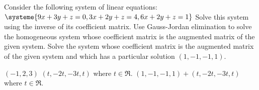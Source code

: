 

\begin{Exercise}[
name={},
title={}, 
difficulty=0,
origin={\cite{BS}}]
Consider the following system of linear equations:
$\systeme{9x+3y+z=0,3x+2y+z=4,6x+2y+z=1}$
\Question Solve this system using the inverse of its coefficient matrix.
\Question Use Gauss-Jordan elimination to solve the homogeneous system whose coefficient matrix is the augmented matrix of the given system.
\Question Solve the system whose coefficient matrix is the augmented matrix of the given system and which has a particular solution $(1, -1, -1, 1)$.
\end{Exercise}
\begin{Answer}
\Question $(-1, 2, 3)$
\Question $(t, -2t, -3t, t)$ where $t\in\Re$.
\Question $(1, -1, -1, 1)+(t, -2t, -3t, t)$ where $t\in\Re$.
\end{Answer}
